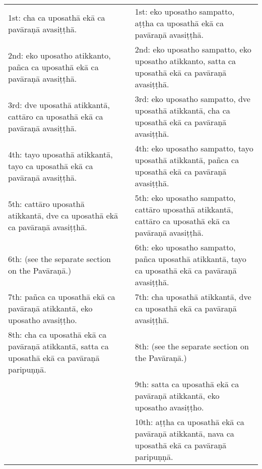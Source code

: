 \begin{tabular}{p{}
				p{}
				p{}}
1st: cha ca uposathā ekā ca pavāraṇā avasiṭṭhā.	 & 	 & 	 1st: eko uposatho sampatto, aṭṭha ca uposathā ekā ca pavāraṇā avasiṭṭhā.\\
2nd: eko uposatho atikkanto, pañca ca uposathā ekā ca pavāraṇā avasiṭṭhā.	 & 	 & 	 2nd: eko uposatho sampatto, eko uposatho atikkanto, satta ca uposathā ekā ca pavāraṇā avasiṭṭhā.\\
3rd: dve uposathā atikkantā, cattāro ca uposathā ekā ca pavāraṇā avasiṭṭhā.	 & 	 & 	 3rd: eko uposatho sampatto, dve uposathā atikkantā, cha ca uposathā ekā ca pavāraṇā avasiṭṭhā.\\
4th: tayo uposathā atikkantā, tayo ca uposathā ekā ca pavāraṇā avasiṭṭhā.	 & 	 & 	 4th: eko uposatho sampatto, tayo uposathā atikkantā, pañca ca uposathā ekā ca pavāraṇā avasiṭṭhā.\\
5th: cattāro uposathā atikkantā, dve ca uposathā ekā ca pavāraṇā avasiṭṭhā.	 & 	 & 	 5th:  eko uposatho sampatto, cattāro uposathā atikkantā, cattāro ca uposathā ekā ca pavāraṇā avasiṭṭhā.\\
6th: (see the separate section on the Pavāraṇā.)	 & 	 & 	 6th:  eko uposatho sampatto, pañca uposathā atikkantā, tayo ca uposathā ekā ca pavāraṇā avasiṭṭhā.\\
7th: pañca ca uposathā ekā ca pavāraṇā atikkantā, eko uposatho avasiṭṭho.	 & 	 & 	 7th: cha uposathā atikkantā, dve ca uposathā ekā ca pavāraṇā avasiṭṭhā.\\
8th: cha ca uposathā ekā ca pavāraṇā atikkantā, satta ca uposathā ekā ca pavāraṇā paripuṇṇā.	 & 	 & 	 8th: (see the separate section on the Pavāraṇā.)\\
																					&	&	9th: satta ca uposathā ekā ca pavāraṇā atikkantā, eko uposatho avasiṭṭho.\\
																			&	&	10th: aṭṭha ca uposathā ekā ca pavāraṇā atikkantā, nava ca uposathā ekā ca pavāraṇā paripuṇṇā.\\

\end{tabular}